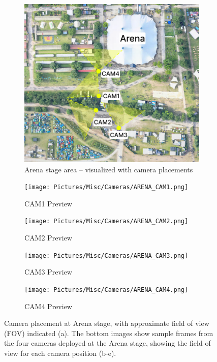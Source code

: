 \begin{figure}
  \centering
  \begin{subfigure}{0.8\textwidth}
    \centering
    \includegraphics[width=\textwidth]{Pictures/Figures/arena_cameras.png}
    \caption{Arena stage area -- visualized with camera placements}

  \end{subfigure}
  \begin{subfigure}{0.37\textwidth}
    \centering
    \texttt{[image: Pictures/Misc/Cameras/ARENA\_CAM1.png]}
    \caption{CAM1 Preview}
  \end{subfigure}%
  \hspace{0.06\textwidth}
  \begin{subfigure}{0.37\textwidth}
    \centering
    \texttt{[image: Pictures/Misc/Cameras/ARENA\_CAM2.png]}
    \caption{CAM2 Preview}
  \end{subfigure}

  \begin{subfigure}{0.37\textwidth}
    \centering
    \texttt{[image: Pictures/Misc/Cameras/ARENA\_CAM3.png]}
    \caption{CAM3 Preview}
  \end{subfigure}%
  \hspace{0.06\textwidth}
  \begin{subfigure}{0.37\textwidth}
    \centering
    \texttt{[image: Pictures/Misc/Cameras/ARENA\_CAM4.png]}
    \caption{CAM4 Preview}
  \end{subfigure}

  \caption{Camera placement at Arena stage, with approximate field of view (FOV) indicated (a). The bottom images show sample frames from the four cameras deployed at the Arena stage, showing the field of view for each camera position (b-e).}
  \label{fig:arena_cameras}

\end{figure}


